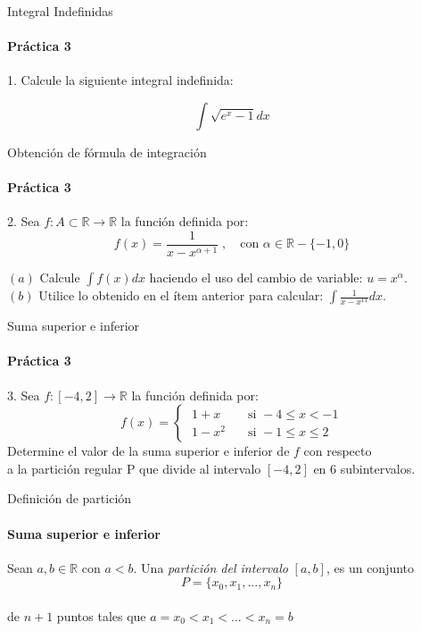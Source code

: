 \documentclass{plantillaPPT}
\begin{document}
\primeraDiapo

\begin{frame}{Integral Indefinidas}
    \framesubtitle{Práctica 3}

1. Calcule la siguiente integral indefinida:

\[\int \sqrt{e^x-1}dx\]
    
\end{frame}

\begin{frame}{Obtención de fórmula de integración}
    \framesubtitle{Práctica 3}
    \vspace{-1cm}

2. Sea \(f: A\subset \mathbb{R} \to \mathbb{R}\) la función definida por: \vspace{0.25cm}
\[f(x) = \frac{1}{x-x^{\alpha+1}}\; , \quad \text{con }  \alpha \in \mathbb{R} - \{-1, 0\}\]
\vspace{0.25cm}

\hspace{-0.5cm}\((a)\) Calcule \(\int f(x)dx\) haciendo el uso del cambio de variable: \(u = x^\alpha\). \\
\hspace{-0.5cm}\((b)\) Utilice lo obtenido en el ítem anterior para calcular: \(\int \frac{1}{x-x^{11}}dx\).
    
\end{frame}

\begin{frame}{Suma superior e inferior}
    \framesubtitle{Práctica 3}
    \vspace{-1cm}
3. Sea \(f: [-4,2] \to \mathbb{R}\) la función definida por:
\vspace{0.25cm}
\[f(x) = \begin{cases}
    \; 1+x & \quad \text{si } -4\leq x <-1 \\
    \; 1-x^2 & \quad \text{si } -1\leq x \leq 2
\end{cases}\]
\vspace{0.25cm}
Determine el valor de la suma superior e inferior de \(f\) con respecto \\ \vspace{-0.2cm} a la partición regular P que divide al intervalo \([-4,2]\) en 6 subintervalos.

\end{frame}

\begin{frame}{Definición de partición}
    \framesubtitle{Suma superior e inferior}

\begin{definicion}
Sean \(a,b \in \mathbb{R}\) con \(a<b\). Una \textit{partición del intervalo} \([a,b]\), es un conjunto \vspace{0.25cm}
\[P = \{x_0, x_1,..., x_n\}\] \\
\vspace{0.25cm}
de \(n+1\) puntos tales que \(a=x_0<x_1<...<x_n=b\)
\end{definicion}
    
\end{frame}
\end{document}
